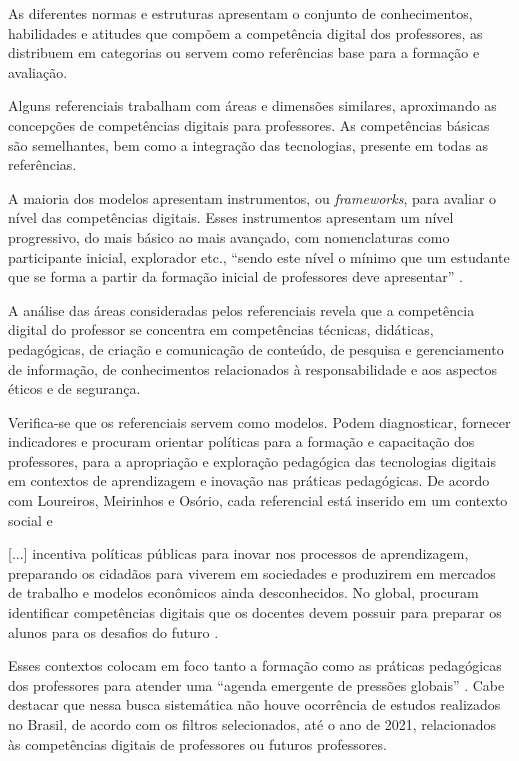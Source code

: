 \documentclass[portuguese]{textolivre}
\begin{document}
%
%
%

As diferentes normas e estruturas apresentam o conjunto de
conhecimentos, habilidades e atitudes que compõem a competência digital
dos professores, as distribuem em categorias ou servem como referências
base para a formação e avaliação.

Alguns referenciais trabalham com áreas e dimensões similares,
aproximando as concepções de competências digitais para professores. As
competências básicas são semelhantes, bem como a integração das
tecnologias, presente em todas as referências.

A maioria dos modelos apresentam instrumentos, ou \emph{frameworks},
para avaliar o nível das competências digitais. Esses instrumentos
apresentam um nível progressivo, do mais básico ao mais avançado, com
nomenclaturas como participante inicial, explorador etc., ``sendo este
nível o mínimo que um estudante que se forma a partir da formação
inicial de professores deve apresentar'' \cite[p.~62]{quiroz2016}.

A análise das áreas consideradas pelos referenciais revela que a
competência digital do professor se concentra em competências técnicas,
didáticas, pedagógicas, de criação e comunicação de conteúdo, de
pesquisa e gerenciamento de informação, de conhecimentos relacionados à
responsabilidade e aos aspectos éticos e de segurança.

Verifica-se que os referenciais servem como modelos. Podem diagnosticar,
fornecer indicadores e procuram orientar políticas para a formação e
capacitação dos professores, para a apropriação e exploração pedagógica
das tecnologias digitais em contextos de aprendizagem e inovação nas
práticas pedagógicas. De acordo com Loureiros, Meirinhos e Osório, cada
referencial está inserido em um contexto social e

{[}...{]} incentiva políticas públicas para inovar nos processos de
aprendizagem, preparando os cidadãos para viverem em sociedades e
produzirem em mercados de trabalho e modelos econômicos ainda
desconhecidos. No global, procuram identificar competências digitais que
os docentes devem possuir para preparar os alunos para os desafios do
futuro \cite[p.~15]{loureiro2020}.

Esses contextos colocam em foco tanto a formação como as práticas
pedagógicas dos professores para atender uma ``agenda emergente de
pressões globais'' \cite[p.~17]{loureiro2020}. Cabe destacar que nessa
busca sistemática não houve ocorrência de estudos realizados no Brasil,
de acordo com os filtros selecionados, até o ano de 2021, relacionados
às competências digitais de professores ou futuros professores.
\end{document}
